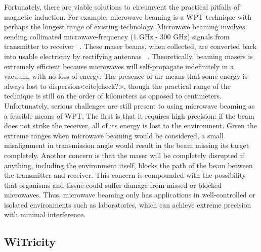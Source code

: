 Fortunately, there are viable solutions to circumvent the practical pitfalls of magnetic induction. For example, microwave beaming is a WPT technique with perhaps the longest range of existing technology. Microwave beaming involves sending collimated microwave-frequency (1 GHz - 300 GHz) signals from transmitter to receiver ~\cite{goldstein_polarized_2003}. These maser beams, when collected, are converted back into usable electricity by  rectifying antennas ~\cite{zhai_practical_2010}. Theoretically, beaming masers is extremely efficient because microwaves will self-propagate indefinitely in a vacuum, with no loss of energy. The presence of air means that some energy is always lost to dispersion<cite|check?>, though the practical range of the technique is still on the order of kilometers as opposed to centimeters. Unfortunately, serious challenges are still present to using microwave beaming as a feasible means of WPT. The first is that it requires high precision: if the beam does not strike the receiver, all of its energy is lost to the environment. Given the extreme ranges when microwave beaming would be considered, a small misalignment in transmission angle would result in the beam missing its target completely. Another concern is that the maser will be completely disrupted if anything, including the environment itself, blocks the path of the beam between the transmitter and receiver. This concern is compounded with the possibility that organisms and tissue could suffer damage from missed or blocked microwaves. Thus, microwave beaming only has applications in well-controlled or isolated environments such as laboratories, which can achieve extreme precision with minimal interference.

\subsection{WiTricity}


